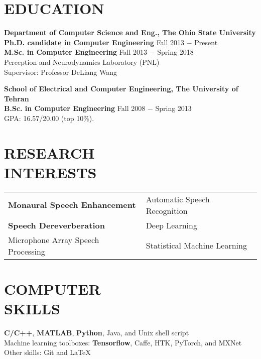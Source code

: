 \documentclass[margin, 10pt]{res}
\begin{document}
\begin{resume}

\section{EDUCATION}
\textbf{Department of Computer Science and Eng., The Ohio State University }  \\
\textbf{Ph.D. candidate in Computer Engineering} \hfill {\footnotesize Fall 2013 $-$ Present} \\
\textbf{M.Sc. in Computer Engineering} \hfill {\footnotesize Fall 2013 $-$ Spring 2018} \\
Perception and Neurodynamics Laboratory (PNL)\\
Supervisor: Professor DeLiang Wang

\textbf{School of Electrical and Computer Engineering, The University of Tehran}\\
\textbf{B.Sc. in Computer Engineering} \hfill {\footnotesize Fall 2008 $-$ Spring 2013} \\
GPA: 16.57/20.00 (top 10\%).

\section{RESEARCH\\INTERESTS}
\begin{tabular}{l l}
\textbf{Monaural Speech Enhancement}    & \hspace{0.3in}   Automatic Speech Recognition\\ 
\textbf{Speech Dereverberation}    & \hspace{0.3in}    Deep Learning\\ 
Microphone Array Speech Processing  & \hspace{0.3in} Statistical Machine Learning
\end{tabular}

\section{COMPUTER \\ SKILLS}
\textbf{C/C++}, \textbf{MATLAB}, \textbf{Python}, Java, and Unix shell script\\
Machine learning toolboxes: \textbf{Tensorflow},
Caffe, HTK, PyTorch, and MXNet\\
Other skills: Git and LaTeX


\end{resume}
\end{document}
